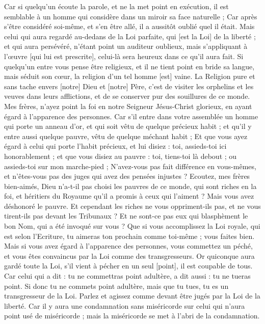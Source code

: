 \begin{multicols}{2}
Car si quelqu'un écoute la parole, et ne la met point en exécution, il est semblable à un homme qui considère dans un miroir sa face naturelle ;
Car après s'être considéré soi-même, et s'en être allé, il a aussitôt oublié quel il était.
Mais celui qui aura regardé au-dedans de la Loi parfaite, qui [est la Loi] de la liberté ; et qui aura persévéré, n'étant point un auditeur oublieux, mais s'appliquant à l'œuvre [qui lui est prescrite], celui-là sera heureux dans ce qu’il aura fait.
Si quelqu'un entre vous pense être religieux, et il ne tient point en bride sa langue, mais séduit son cœur, la religion d'un tel homme [est] vaine.
La Religion pure et sans tache envers [notre] Dieu et [notre] Père, c'est de visiter les orphelins et les veuves dans leurs afflictions, et de se conserver pur des souillures de ce monde.
\VerseOne{}Mes frères, n'ayez point la foi en notre Seigneur Jésus-Christ glorieux, en ayant égard à l'apparence des personnes.
Car s'il entre dans votre assemblée un homme qui porte un anneau d'or, et qui soit vêtu de quelque précieux habit ; et qu’il y entre aussi quelque pauvre, vêtu de quelque méchant habit ;
Et que vous ayez égard à celui qui porte l’habit précieux, et lui disiez : toi, assieds-toi ici honorablement ; et que vous disiez au pauvre : toi, tiens-toi là debout ; ou assieds-toi sur mon marche-pied ;
N'avez-vous pas fait différence en vous-mêmes, et n'êtes-vous pas des juges qui avez des pensées injustes ?
Ecoutez, mes frères bien-aimés, Dieu n'a-t-il pas choisi les pauvres de ce monde, qui sont riches en la foi, et héritiers du Royaume qu'il a promis à ceux qui l'aiment ?
Mais vous avez déshonoré le pauvre. Et cependant les riches ne vous oppriment-ils pas, et ne vous tirent-ils pas devant les Tribunaux ?
Et ne sont-ce pas eux qui blasphèment le bon Nom, qui a été invoqué sur vous ?
Que si vous accomplissez la Loi royale, qui est selon l'Ecriture, tu aimeras ton prochain comme toi-même ; vous faites bien.
Mais si vous avez égard à l'apparence des personnes, vous commettez un péché, et vous êtes convaincus par la Loi comme des transgresseurs.
Or quiconque aura gardé toute la Loi, s'il vient à pécher en un seul [point], il est coupable de tous.
Car celui qui a dit : tu ne commettras point adultère, a dit aussi : tu ne tueras point. Si donc tu ne commets point adultère, mais que tu tues, tu es un transgresseur de la Loi.
Parlez et agissez comme devant être jugés par la Loi de la liberté.
Car il y aura une condamnation sans miséricorde sur celui qui n'aura point usé de miséricorde ; mais la miséricorde se met à l'abri de la condamnation.

\end{multicols}
